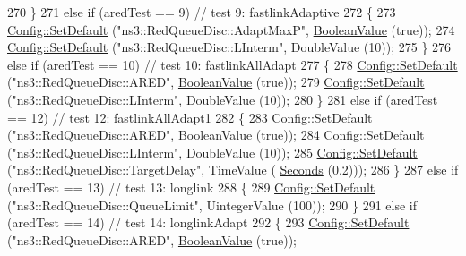 \begin{DoxyCode}
270     \}
271   \textcolor{keywordflow}{else} \textcolor{keywordflow}{if} (aredTest == 9) \textcolor{comment}{// test 9: fastlinkAdaptive}
272     \{
273       \hyperlink{group__config_ga2e7882df849d8ba4aaad31c934c40c06}{Config::SetDefault} (\textcolor{stringliteral}{"ns3::RedQueueDisc::AdaptMaxP"}, 
      \hyperlink{classns3_1_1BooleanValue}{BooleanValue} (\textcolor{keyword}{true}));
274       \hyperlink{group__config_ga2e7882df849d8ba4aaad31c934c40c06}{Config::SetDefault} (\textcolor{stringliteral}{"ns3::RedQueueDisc::LInterm"}, DoubleValue (10));
275     \}
276   \textcolor{keywordflow}{else} \textcolor{keywordflow}{if} (aredTest == 10) \textcolor{comment}{// test 10: fastlinkAllAdapt}
277     \{
278       \hyperlink{group__config_ga2e7882df849d8ba4aaad31c934c40c06}{Config::SetDefault} (\textcolor{stringliteral}{"ns3::RedQueueDisc::ARED"}, 
      \hyperlink{classns3_1_1BooleanValue}{BooleanValue} (\textcolor{keyword}{true}));
279       \hyperlink{group__config_ga2e7882df849d8ba4aaad31c934c40c06}{Config::SetDefault} (\textcolor{stringliteral}{"ns3::RedQueueDisc::LInterm"}, DoubleValue (10));
280     \}
281   \textcolor{keywordflow}{else} \textcolor{keywordflow}{if} (aredTest == 12) \textcolor{comment}{// test 12: fastlinkAllAdapt1}
282     \{
283       \hyperlink{group__config_ga2e7882df849d8ba4aaad31c934c40c06}{Config::SetDefault} (\textcolor{stringliteral}{"ns3::RedQueueDisc::ARED"}, 
      \hyperlink{classns3_1_1BooleanValue}{BooleanValue} (\textcolor{keyword}{true}));
284       \hyperlink{group__config_ga2e7882df849d8ba4aaad31c934c40c06}{Config::SetDefault} (\textcolor{stringliteral}{"ns3::RedQueueDisc::LInterm"}, DoubleValue (10));
285       \hyperlink{group__config_ga2e7882df849d8ba4aaad31c934c40c06}{Config::SetDefault} (\textcolor{stringliteral}{"ns3::RedQueueDisc::TargetDelay"}, TimeValue (
      \hyperlink{group__timecivil_ga33c34b816f8ff6628e33d5c8e9713b9e}{Seconds} (0.2)));
286     \}
287   \textcolor{keywordflow}{else} \textcolor{keywordflow}{if} (aredTest == 13) \textcolor{comment}{// test 13: longlink}
288     \{
289       \hyperlink{group__config_ga2e7882df849d8ba4aaad31c934c40c06}{Config::SetDefault} (\textcolor{stringliteral}{"ns3::RedQueueDisc::QueueLimit"}, UintegerValue (100));
290     \}
291   \textcolor{keywordflow}{else} \textcolor{keywordflow}{if} (aredTest == 14) \textcolor{comment}{// test 14: longlinkAdapt}
292     \{
293       \hyperlink{group__config_ga2e7882df849d8ba4aaad31c934c40c06}{Config::SetDefault} (\textcolor{stringliteral}{"ns3::RedQueueDisc::ARED"}, 
      \hyperlink{classns3_1_1BooleanValue}{BooleanValue} (\textcolor{keyword}{true}));

\end{DoxyCode}

